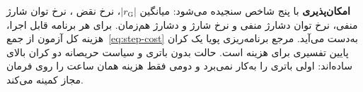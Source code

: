 \textbf{امکان‌پذیری} با پنج شاخص سنجیده می‌شود: میانگین $|r_{\mathrm{G}}|$، نرخ نقض ، نرخ توان شارژ منفی، نرخ توان دشارژ منفی و نرخ شارژ و دشارژ هم‌زمان. برای هر برنامه قابل اجرا، هزینه کل آزمون از جمع~\eqref{eq:step-cost} به‌دست می‌آید. مرجع برنامه‌ریزی پویا یک کران پایین تفسیری برای هزینه است. حالت بدون باتری و سیاست حریصانه دو کران بالای ساده‌اند: اولی باتری را به‌کار نمی‌برد و دومی فقط هزینه همان ساعت را روی فرمان مجاز کمینه می‌کند.

